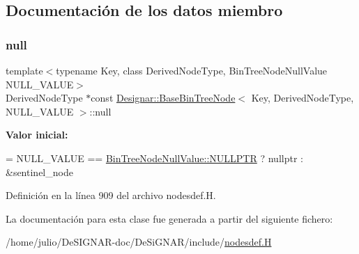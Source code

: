 \subsection{Documentación de los datos miembro}
\mbox{\label{class_designar_1_1_base_bin_tree_node_a0ea0251169acae6e7943ccc54f66472a}} 
\subsubsection{\texorpdfstring{null}{null}}
{\footnotesize\ttfamily template$<$typename Key, class Derived\+Node\+Type, Bin\+Tree\+Node\+Null\+Value N\+U\+L\+L\+\_\+\+V\+A\+L\+UE$>$ \\
Derived\+Node\+Type $\ast$const \hyperlink{class_designar_1_1_base_bin_tree_node}{Designar\+::\+Base\+Bin\+Tree\+Node}$<$ Key, Derived\+Node\+Type, N\+U\+L\+L\+\_\+\+V\+A\+L\+UE $>$\+::null\hspace{0.3cm}{\ttfamily [static]}}

{\bfseries Valor inicial\+:}
\begin{DoxyCode}
=
    NULL\_VALUE == \hyperlink{namespace_designar_adc51778fc9415de368881abd254cca7cabf31abdbb1a298903e3a7f0edd0dcaf9}{BinTreeNodeNullValue::NULLPTR} ? nullptr : &sentinel\_node
\end{DoxyCode}


Definición en la línea 909 del archivo nodesdef.\+H.



La documentación para esta clase fue generada a partir del siguiente fichero\+:\begin{DoxyCompactItemize}
\item 
/home/julio/\+De\+S\+I\+G\+N\+A\+R-\/doc/\+De\+Si\+G\+N\+A\+R/include/\hyperlink{nodesdef_8_h}{nodesdef.\+H}\end{DoxyCompactItemize}

